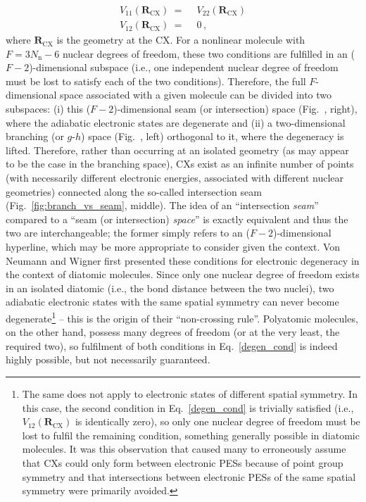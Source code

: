 \documentclass[9pt,bestpractices]{livecoms}
\newcommand{\R}{\mathbf{R}}
\begin{document}
\begin{equation}
\label{degen_cond}
\begin{split}
    V_{11}(\R_{\text{CX}}) \: =& \:\: V_{22}(\R_{\text{CX}})\\
    V_{12}(\R_{\text{CX}}) \: =& \:\: 0 \, ,
\end{split}
\end{equation}
where $\R_\text{CX}$ is the geometry at the CX. For a nonlinear molecule with $F = 3N_\text{n} - 6$ nuclear degrees of freedom, these two conditions are fulfilled in an ($F - 2$)-dimensional subspace (i.e., one independent nuclear degree of freedom must be lost to satisfy each of the two conditions).\cite{malhado2014non}
Therefore, the full $F$-dimensional space associated with a given molecule can be divided into two subspaces: (i) this ($F - 2$)-dimensional seam (or intersection) space\cite{atchity_potential_1991} (Fig.~, right), where the adiabatic electronic states are degenerate and (ii) a two-dimensional branching\cite{atchity_potential_1991} (or $g$-$h$)\cite{yarkony_conical_2001} space (Fig.~, left) orthogonal to it, where the degeneracy is lifted.
Therefore, rather than occurring at an isolated geometry (as may appear to be the case in the branching space), CXs exist as an infinite number of points (with necessarily different electronic energies, associated with different nuclear geometries) connected\cite{B407959K, coe2008extent, morreale2024topology, barbatti2004photochemistry} along the so-called intersection seam (Fig.~\ref{fig:branch_vs_seam}, middle).
The idea of an ``intersection \textit{seam}'' compared to a ``seam (or intersection) \textit{space}'' is exactly equivalent and thus the two are interchangeable; the former simply refers to an ($F - 2$)-dimensional hyperline, which may be more appropriate to consider given the context.
Von Neumann and Wigner first presented these conditions for electronic degeneracy in the context of diatomic molecules.
Since only one nuclear degree of freedom exists in an isolated diatomic (i.e., the bond distance between the two nuclei), two adiabatic electronic states with the same spatial symmetry can never become degenerate\footnote{
The same does not apply to electronic states of different spatial symmetry. 
In this case, the second condition in Eq.~\eqref{degen_cond} is trivially satisfied (i.e., $V_{12}(\R_{\text{CX}})$ is identically zero), so only one nuclear degree of freedom must be lost to fulfil the remaining condition, something generally possible in diatomic molecules. 
It was this observation that caused many to erroneously assume that CXs could only form between electronic PESs because of point group symmetry and that intersections between electronic PESs of the same spatial symmetry were primarily avoided.\cite{domcke_conical_2004}
} 
-- this is the origin of their ``non-crossing rule''.\cite{vonneumann1929eigenvalues}
Polyatomic molecules, on the other hand, possess many degrees of freedom (or at the very least, the required two), so fulfilment of both conditions in Eq.~\eqref{degen_cond} is indeed highly possible, but not necessarily guaranteed.\cite{yarkony_conical_1998}
\end{document}
